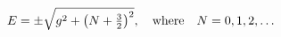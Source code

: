 \begin{equation}
\label{specf=0}
E = \pm \sqrt{g^2 + \left(N+\tfrac{3}{2}\right)^2},~~~ {\rm
where}~~~ N = 0, 1, 2, \dots  
\end{equation}

